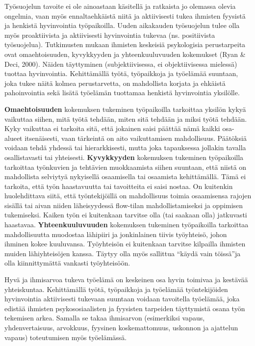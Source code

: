 \documentclass[nobib,finnish,oneside,openany,notoc,a4paper]{tufte-book}
\begin{document}
Työsuojelun tavoite ei ole ainoastaan käsitellä ja ratkaista jo olemassa
olevia ongelmia, vaan myös ennaltaehkäistä niitä ja aktiivisesti tukea
ihmisten fyysistä ja henkistä hyvinvointia työpaikoilla. Uuden
aikakauden työsuojelun tulee olla myös proaktiivista ja aktiivisesti
hyvinvointia tukevaa (ns. positiivista työsuojelua). Tutkimusten mukaan
ihmisten keskeisiä psykologisia perustarpeita ovat omaehtoisuuden,
kyvykkyyden ja yhteenkuuluvuuden kokemukset (Ryan \& Deci, 2000). Näiden
täyttyminen (subjektiivisessa, ei objektiivisessa mielessä) tuottaa
hyvinvointia. Kehittämällä työtä, työpaikkoja ja työelämää suuntaan,
joka tukee näitä kolmea perustarvetta, on mahdollista korjata ja
ehkäistä pahoinvointia sekä lisätä työelämän tuottamaa henkistä
hyvinvointia yksilölle.

\textbf{Omaehtoisuuden } kokemuksen tukeminen työpaikoilla tarkoittaa
yksilön kykyä vaikuttaa siihen, mitä työtä tehdään, miten sitä tehdään
ja miksi työtä tehdään. Kyky vaikuttaa ei tarkoita sitä, että jokainen
saisi päättää nämä kaikki osa-alueet itsenäisesti, vaan tärkeintä on
aito vaikuttamisen mahdollisuus. Päätöksiä voidaan tehdä yhdessä tai
hierarkkisesti, mutta joka tapauksessa jollakin tavalla osallistavasti
tai yhteisesti. \textbf{Kyvykkyyden }kokemuksen tukeminen työpaikoilla
tarkoittaa työnkuvien ja tehtävien muokkaamista siihen suuntaan, että
niistä on mahdollista selviytyä nykyisellä osaamisella tai osaamista
kehittämällä. Tämä ei tarkoita, että työn haastavuutta tai tavoitteita
ei saisi nostaa. On kuitenkin huolehdittava siitä, että työntekijöillä
on mahdollisuus toimia osaamisensa rajojen sisällä tai aivan niiden
läheisyydessä flow-tilan mahdollistamiseksi ja oppimisen tukemiseksi.
Kaiken työn ei kuitenkaan tarvitse olla (tai saakaan olla) jatkuvasti
haastavaa. \textbf{Yhteenkuuluvuuden }kokemuksen tukeminen työpaikoilla
tarkoittaa mahdollisuutta muodostaa lähipiiri ja jonkinlainen tiivis
työyhteisö, johon ihminen kokee kuuluvansa. Työyhteisön ei kuitenkaan
tarvitse kilpailla ihmisten muiden lähiyhteisöjen kanssa. Täytyy olla
myös sallittua ``käydä vain töissä''ja olla kiinnittymättä vankasti
työyhteisöön.

Hyvä ja ihmisarvoa tukeva työelämä on keskeinen osa hyvin toimivaa ja
kestävää yhteiskuntaa. Kehittämällä työtä, työpaikkoja ja työelämää
työntekijöiden hyvinvointia aktiivisesti tukevaan suuntaan voidaan
tavoitella työelämää, joka edistää ihmisten psykososiaalisten ja
fyysisten tarpeiden täyttymistä osana työn tekemisen arkea. Samalla se
takaa ihmisarvon (esimerkiksi vapaus, yhdenvertaisuus, arvokkuus,
fyysinen koskemattomuus, uskonnon ja ajattelun vapaus) toteutumisen myös
työelämässä.
\end{document}
